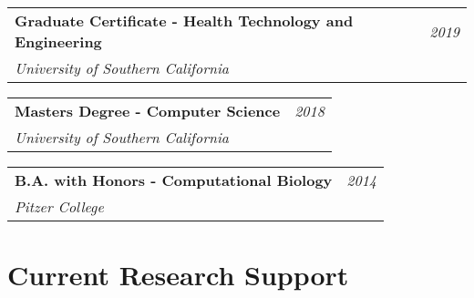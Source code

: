 \documentclass[10pt,a4paper]{article}
\begin{document}
  \vspace*{1mm}\noindent\begin{tabularx}{17cm}{X r}
    \textbf{Graduate Certificate - Health Technology and Engineering} & \textit{2019} \\ %
    \textit{University of Southern California}
  \end{tabularx} 

  \vspace*{1mm}\noindent\begin{tabularx}{17cm}{X r}
    \textbf{Masters Degree - Computer Science} & \textit{2018} \\ %
    \textit{University of Southern California}
  \end{tabularx} 

  \vspace*{1mm}\noindent\begin{tabularx}{17cm}{X r}
    \textbf{B.A. with Honors - Computational Biology} & \textit{2014} \\
    \textit{Pitzer College}
  \end{tabularx}

  \vspace*{2mm}\section*{Current Research Support}
\end{document}
